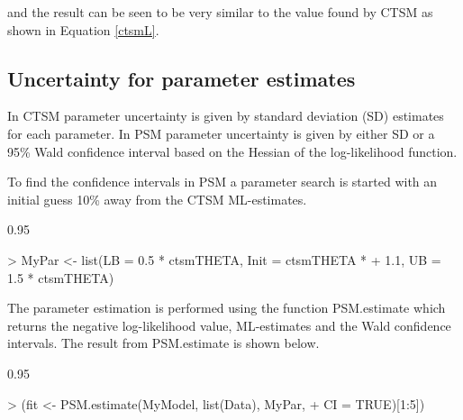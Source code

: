 \documentclass{article}
\renewenvironment{Schunk}
{\begin{center} \begin{boxedminipage}{0.95\textwidth} }
{\end{boxedminipage}\end{center}}
\begin{document}
\noindent and the result can be seen to be very similar to the value found by
CTSM as shown in Equation \eqref{ctsmL}.

\subsection{Uncertainty for parameter estimates}


In CTSM parameter uncertainty is given by standard deviation (SD)
estimates for each parameter. In PSM parameter uncertainty is given by
either SD or a 95\% Wald confidence interval based on the Hessian of
the log-likelihood function.

To find the confidence intervals in PSM a parameter search is started
with an initial guess 10\% away from the CTSM ML-estimates. 

\begin{Schunk}
\begin{Sinput}
> MyPar <- list(LB = 0.5 * ctsmTHETA, Init = ctsmTHETA * 
+     1.1, UB = 1.5 * ctsmTHETA)
\end{Sinput}
\end{Schunk}

The parameter estimation is performed using the function PSM.estimate
which returns the negative log-likelihood value, ML-estimates and the
Wald confidence intervals. The result from PSM.estimate is shown below.

\begin{Schunk}
\begin{Sinput}
> (fit <- PSM.estimate(MyModel, list(Data), MyPar, 
+     CI = TRUE)[1:5])
\end{Sinput}
\end{Schunk}
\end{document}
